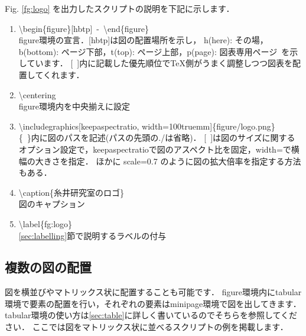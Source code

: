 \documentclass[11pt,a4j,onecolumn]{jsreport} %
\begin{document}
\newpage

Fig. \ref{fg:logo} を出力したスクリプトの説明を下記に示します．

\begin{enumerate}
  \item \textbackslash begin\{figure\}[hbtp]~-~\textbackslash end\{figure\}\\
    figure環境の宣言．[hbtp]は図の配置場所を示し，
    h(here): その場，b(bottom): ページ下部，t(top): ページ上部，p(page): 図表専用ページ~を示しています．
    [~]内に記載した優先順位で\TeX 側がうまく調整しつつ図表を配置してくれます．
  \item \textbackslash centering\\
    figure環境内を中央揃えに設定
  \item \textbackslash includegraphics[keepaspectratio, width=100truemm]\{figure/logo.png\}\\
    \{~\}内に図のパスを記述(パスの先頭の./は省略)．
    [~]は図のサイズに関するオプション設定で，keepaspectratioで図のアスペクト比を固定，width=で横幅の大きさを指定．
    ほかに scale=0.7 のように図の拡大倍率を指定する方法もある．
  \item \textbackslash caption\{糸井研究室のロゴ\}\\
    図のキャプション
  \item \textbackslash label\{fg:logo\}\\
    \ref{sec:labelling}節で説明するラベルの付与
\end{enumerate}

\subsection{複数の図の配置}

図を横並びやマトリックス状に配置することも可能です．
figure環境内にtabular環境で要素の配置を行い，それぞれの要素はminipage環境で図を出してきます．
tabular環境の使い方は\ref{sec:table}に詳しく書いているのでそちらを参照してください．
ここでは図をマトリックス状に並べるスクリプトの例を掲載します．
\end{document}
